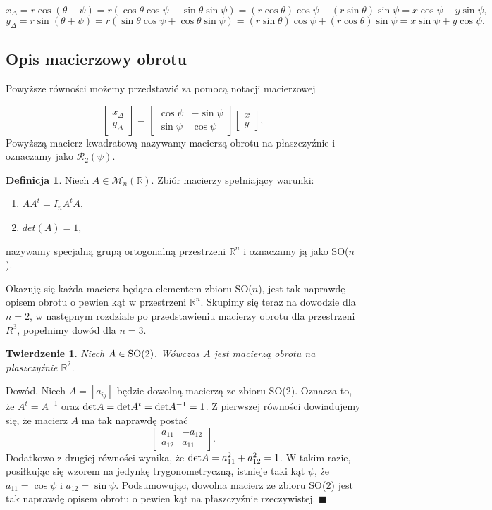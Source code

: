 \documentclass[a4paper,twoside,11pt,reqno]{mwrep}
\theoremstyle{plain} \newtheorem{twr}{Twierdzenie}
\theoremstyle{plain} \newtheorem{lem}{Lemat}
\theoremstyle{definition} \newtheorem{defi}{Definicja}
\theoremstyle{remark} \newtheorem*{wni}{Wniosek}
\theoremstyle{definition} \newtheorem{uwaga}{Uwaga}
\theoremstyle{definition}\newtheorem{prz}{Przykład}
\newenvironment{dowod}{\par\vspace{0.1cm}\par{\sc Dowód.}}{\hfill $\blacksquare$\par\vspace{0.4cm}\par}
\begin{document}
$$x_\Delta=r\cos(\theta +\psi) =
r(\cos\theta \cos\psi - \sin \theta \sin \psi)=(r\cos\theta) \cos\psi -
(r\sin \theta) \sin \psi = x \cos\psi - y\sin \psi,$$
$$y_\Delta=r\sin(\theta +\psi)= r(\sin \theta \cos \psi +
\cos\theta \sin\psi) = (r\sin \theta) \cos \psi +
(r\cos\theta) \sin\psi  = x\sin\psi +y\cos\psi . $$

\subsection{Opis macierzowy obrotu}\label{SO(2)}
Powyższe równości możemy przedstawić za pomocą notacji macierzowej

$$
\begin{bmatrix}
x_\Delta\\
y_\Delta
\end{bmatrix} =
\begin{bmatrix}
\cos\psi   & -\sin\psi \\
\sin\psi & \cos\psi  
\end{bmatrix}
\begin{bmatrix}
x \\
y 
\end{bmatrix},
$$
Powyższą macierz kwadratową nazywamy macierzą obrotu na płaszczyźnie i oznaczamy jako
$\mathcal{R}_2(\psi)$.

\begin{defi}
Niech $A\in\mathcal{M}_n(\mathbb{R})$. Zbiór macierzy spełniający warunki:
\begin{enumerate}
	\item $ AA^t=I_n  A^tA,$
	\item $ det(A)=1,$
\end{enumerate}
nazywamy specjalną grupą ortogonalną przestrzeni $\mathbb{R}^n$ i oznaczamy ją jako 
SO($n$).
\end{defi}

Okazuję się każda macierz będąca elementem zbioru SO($n$), jest tak naprawdę opisem 
obrotu o pewien kąt w przestrzeni $\mathbb{R}^n$. Skupimy się teraz na dowodzie dla $n=2$,
w następnym rozdziale po przedstawieniu macierzy obrotu dla przestrzeni $R^3$, 
popełnimy dowód dla $n=3$.
\begin{twr}\label{rotationMatrixSO(2)}
Niech $A\in\textup{SO}(2)$. Wówczas $A$ jest macierzą obrotu na płaszczyźnie $\mathbb{R}^2$.
\end{twr}
\begin{dowod}
Niech $A=[a_{ij}]$ będzie dowolną macierzą ze zbioru SO($2$).
Oznacza to, że $A^t = A^{-1}$ oraz $\textup{det}A=\textup{det}A^t=\textup{det}A^{-1}=1$.
Z pierwszej równości dowiadujemy się, że macierz $A$ ma tak naprawdę postać
$$\begin{bmatrix}
a_{11}&-a_{12} \\
a_{12} & a_{11}
\end{bmatrix}.$$
Dodatkowo z drugiej równości wynika, że $\textup{det}A = a^2_{11}+a^2_{12}=1$.
W takim razie, posiłkując się wzorem na jedynkę trygonometryczną,
istnieje taki kąt $\psi$, że  $a_{11}=\cos\psi$ i $a_{12}=\sin\psi$.
Podsumowując, dowolna macierz ze zbioru SO($2$) jest tak naprawdę
opisem obrotu o pewien kąt na płaszczyźnie rzeczywistej.
\end{dowod}
\end{document}
